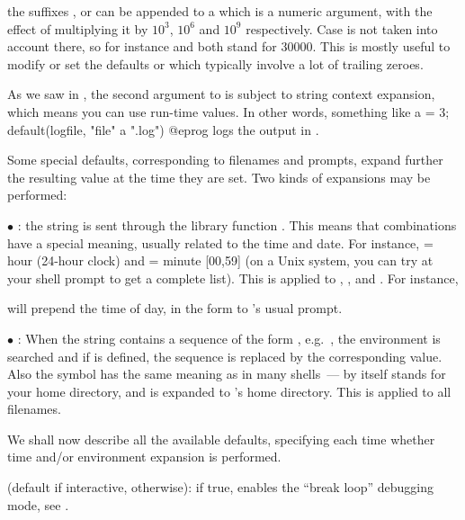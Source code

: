  the suffixes ,  or  can be appended to
a  which is a numeric argument, with the effect of multiplying it
by $10^3$, $10^6$ and $10^9$ respectively. Case is not taken into account
there, so for instance  and  both stand for $30000$. This
is mostly useful to modify or set the defaults  or
 which typically involve a lot of trailing zeroes.

 As we saw in ,
the second argument to  is subject to string context
expansion, which means you can use run-time values. In other words, something
like
\bprog
  a = 3;
  default(logfile, "file" a ".log")
@eprog
logs the output in .

Some special defaults, corresponding to filenames and prompts, expand further
the resulting value at the time they are set. Two kinds of expansions may be
performed:

$\bullet$ : the string is sent through the library
function . This means that \kbd{\%} combinations have
a special meaning, usually related to the time and date. For instance,
 = hour (24-hour clock) and  = minute [00,59] (on a Unix
system, you can try  at your shell prompt to get a complete
list). This is applied to , , and . For
instance,


\noindent
will prepend the time of day, in the form 
to 's usual prompt.

$\bullet$ : When the string contains a sequence of
the form , e.g.~, the environment is
searched and if  is defined, the sequence is replaced by the
corresponding value. Also the \kbd{\til} symbol has the same meaning as in
many shells~--- \kbd{\til} by itself stands for your home directory, and
 is expanded to 's home directory. This is applied
to all filenames. \label{se:envir}

We shall now describe all the available defaults, specifying each time
whether time and/or environment expansion is performed.

 (default  if interactive,  otherwise):
if true, enables the ``break loop'' debugging mode, see .

